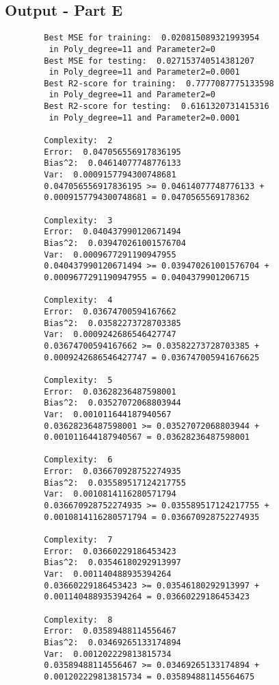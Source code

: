 \subsection{Output - Part E}
\label{chap:Output - Part E}
\begin{verbatim}
        Best MSE for training:  0.020815089321993954 
         in Poly_degree=11 and Parameter2=0
        Best MSE for testing:  0.027153740514381207 
         in Poly_degree=11 and Parameter2=0.0001
        Best R2-score for training:  0.7777087775133598 
         in Poly_degree=11 and Parameter2=0
        Best R2-score for testing:  0.6161320731415316 
         in Poly_degree=11 and Parameter2=0.0001
         
        Complexity:  2
        Error:  0.047056556917836195
        Bias^2:  0.04614077748776133
        Var:  0.0009157794300748681
        0.047056556917836195 >= 0.04614077748776133 +
        0.0009157794300748681 = 0.0470565569178362
        
        Complexity:  3
        Error:  0.040437990120671494
        Bias^2:  0.039470261001576704
        Var:  0.0009677291190947955
        0.040437990120671494 >= 0.039470261001576704 +
        0.0009677291190947955 = 0.0404379901206715
        
        Complexity:  4
        Error:  0.03674700594167662
        Bias^2:  0.03582273728703385
        Var:  0.0009242686546427747
        0.03674700594167662 >= 0.03582273728703385 + 
        0.0009242686546427747 = 0.036747005941676625
        
        Complexity:  5
        Error:  0.03628236487598001
        Bias^2:  0.03527072068803944
        Var:  0.001011644187940567
        0.03628236487598001 >= 0.03527072068803944 + 
        0.001011644187940567 = 0.03628236487598001
        
        Complexity:  6
        Error:  0.036670928752274935
        Bias^2:  0.035589517124217755
        Var:  0.0010814116280571794
        0.036670928752274935 >= 0.035589517124217755 +
        0.0010814116280571794 = 0.036670928752274935
        
        Complexity:  7
        Error:  0.03660229186453423
        Bias^2:  0.03546180292913997
        Var:  0.001140488935394264
        0.03660229186453423 >= 0.03546180292913997 +
        0.001140488935394264 = 0.03660229186453423
        
        Complexity:  8
        Error:  0.03589488114556467
        Bias^2:  0.03469265133174894
        Var:  0.001202229813815734
        0.03589488114556467 >= 0.03469265133174894 + 
        0.001202229813815734 = 0.035894881145564675
        

\end{verbatim}
